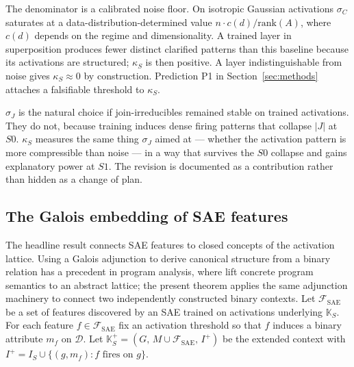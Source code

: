 \documentclass[a4paper,fleqn]{cas-dc}
\newcommand{\D}{\mathcal{D}}
\newcommand{\K}{\mathbb{K}}
\newcommand{\Jirr}{J}
\newcommand{\SAE}{\mathrm{SAE}}
\newcommand{\Fsae}{\mathcal{F}_{\SAE}}
\newcommand{\sigC}{\sigma_C}
\newcommand{\kS}{\kappa_S}
\begin{document}
\noindent The denominator is a calibrated noise floor.
On isotropic Gaussian activations $\sigC$ saturates at a data-distribution-determined value $n \cdot c(d) / \mathrm{rank}(A)$, where $c(d)$ depends on the regime and dimensionality.
A trained layer in superposition produces fewer distinct clarified patterns than this baseline because its activations are structured; $\kS$ is then positive.
A layer indistinguishable from noise gives $\kS \approx 0$ by construction.
Prediction P1 in Section~\ref{sec:methods} attaches a falsifiable threshold to $\kS$.

\begin{remark}[Why $\kS$ and not $\sigma_J$]
$\sigma_J$ is the natural choice if join-irreducibles remained stable on trained activations.
They do not, because training induces dense firing patterns that collapse $|\Jirr|$ at $S0$.
$\kS$ measures the same thing $\sigma_J$ aimed at --- whether the activation pattern is more compressible than noise --- in a way that survives the $S0$ collapse and gains explanatory power at $S1$.
The revision is documented as a contribution rather than hidden as a change of plan.
\end{remark}

\subsection{The Galois embedding of SAE features}

The headline result connects SAE features to closed concepts of the activation lattice.
Using a Galois adjunction to derive canonical structure from a binary relation has a precedent in program analysis, where \citet{cousot1977abstract} lift concrete program semantics to an abstract lattice; the present theorem applies the same adjunction machinery to connect two independently constructed binary contexts.
Let $\Fsae$ be a set of features discovered by an SAE trained on activations underlying $\K_S$.
For each feature $f \in \Fsae$ fix an activation threshold so that $f$ induces a binary attribute $m_f$ on $\D$.
Let $\K_S^+ = (G,\, M \cup \Fsae,\, I^+)$ be the extended context with $I^+ = I_S \cup \{(g, m_f) : f \text{ fires on } g\}$.
\end{document}
